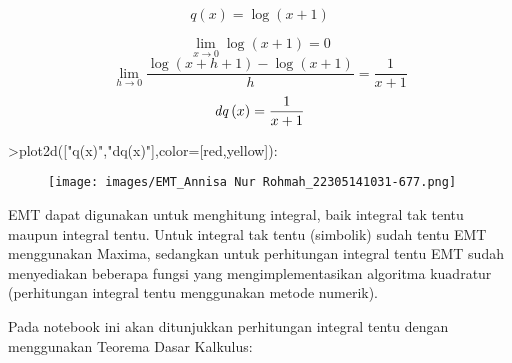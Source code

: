 \documentclass[a4paper,10pt]{article}
\begin{document}
\begin{eulernotebook}
\begin{eulerformula}
\[
q\left(x\right)=\log \left(x+1\right)
\]
\end{eulerformula}
\begin{eulerformula}
\[
 \lim_{x\rightarrow 0}{\log \left(x+1\right)}=0
\]
\[
\lim_{h\rightarrow 0}{\frac{\log \left(x+h+1\right)-\log \left(x+1\right)}{h}}=\frac{1}{x+1}
\]
\[
{\it dq}\left(x\right)=\frac{1}{x+1}
\]
\end{eulerformula}
\begin{eulerprompt}
>plot2d(["q(x)","dq(x)"],color=[red,yellow]):
\end{eulerprompt}
\begin{figure}[h]
    \centering
    \texttt{[image: images/EMT\_Annisa Nur Rohmah\_22305141031-677.png]}
\end{figure}
\begin{eulercomment}
EMT dapat digunakan untuk menghitung integral, baik integral tak tentu
maupun integral tentu. Untuk integral tak tentu (simbolik) sudah tentu
EMT menggunakan Maxima, sedangkan untuk perhitungan integral tentu EMT
sudah menyediakan beberapa fungsi yang mengimplementasikan algoritma
kuadratur (perhitungan integral tentu menggunakan metode numerik).

Pada notebook ini akan ditunjukkan perhitungan integral tentu dengan
menggunakan Teorema Dasar Kalkulus:


\end{eulercomment}
\end{eulernotebook}
\end{document}
